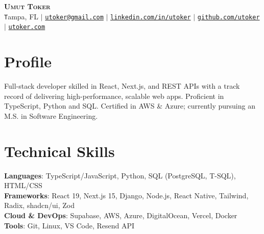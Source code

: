 \documentclass[letterpaper,11pt]{article}
\begin{document}
\begin{center}
    \textbf{\Huge \scshape Umut Toker} \\ \vspace{1pt}
    \texttt Tampa, FL $|$
    \href{mailto:utoker@gmail.com}{\texttt{utoker@gmail.com}} $|$ 
    \href{https://linkedin.com/in/utoker}{\texttt{linkedin.com/in/utoker}} $|$
    \href{https://github.com/utoker}{\texttt{github.com/utoker}} $|$
    \href{https://utoker.com}{\texttt{utoker.com}} 
\end{center}

\section*{Profile}
Full-stack developer skilled in React, Next.js, and REST APIs with a track record of delivering high-performance, scalable web apps. 
Proficient in TypeScript, Python and SQL. 
Certified in AWS \& Azure; currently pursuing an M.S. in Software Engineering.

\section{Technical Skills}
 \begin{itemize}[leftmargin=0.15in, label={}]
    \small{\item{
     \textbf{Languages}{: TypeScript/JavaScript, Python, SQL (PostgreSQL, T-SQL), HTML/CSS} \\[3pt]
     \textbf{Frameworks}{: React 19, Next.js 15, Django, Node.js, React Native, Tailwind, Radix, shadcn/ui, Zod } \\ [3pt]
     \textbf{Cloud \& DevOps}{: Supabase, AWS, Azure, DigitalOcean, Vercel, Docker} \\ [3pt]
     \textbf{Tools}{: Git, Linux, VS Code, Resend API} \\ [3pt]
    }}
 \end{itemize}

\end{document}
